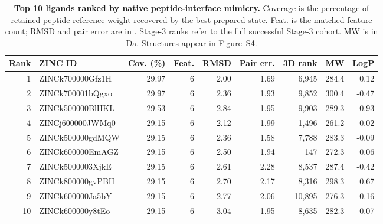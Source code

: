 \begin{table}[tbp]
\centering
\caption{\textbf{Top 10 ligands ranked by native peptide-interface mimicry.} Coverage is the percentage of retained peptide-reference weight recovered by the best prepared state. Feat. is the matched feature count; RMSD and pair error are in \angstrom. Stage-3 ranks refer to the full successful Stage-3 cohort. MW is in Da. Structures appear in Figure~S4.}
\label{tab:top10}
\footnotesize
\setlength{\tabcolsep}{4pt}
\begin{tabular}{@{}rlrrrrrrr@{}}
\toprule
Rank & ZINC ID & Cov. (\%) & Feat. & RMSD & Pair err. & 3D rank & MW & LogP \\
\midrule
1 & ZINCk700000Gfz1H & 29.97 & 6 & 2.00 & 1.69 & 6,945 & 284.4 & 0.12 \\
2 & ZINCk700001bQgxo & 29.97 & 6 & 2.36 & 1.93 & 9,852 & 300.4 & -0.47 \\
3 & ZINCk500000BlHKL & 29.53 & 6 & 2.84 & 1.95 & 9,903 & 289.3 & -0.93 \\
4 & ZINCj600000JWMq0 & 29.15 & 6 & 2.12 & 1.99 & 1,496 & 261.2 & 0.02 \\
5 & ZINCk500000gdMQW & 29.15 & 6 & 2.36 & 1.58 & 7,788 & 283.3 & -0.09 \\
6 & ZINCk600000EmAGZ & 29.15 & 6 & 2.50 & 1.94 & 147 & 272.3 & 0.06 \\
7 & ZINCk5000003XjkE & 29.15 & 6 & 2.61 & 2.28 & 8,537 & 287.4 & -0.42 \\
8 & ZINCk800000gvPBH & 29.15 & 6 & 2.70 & 2.17 & 8,316 & 298.3 & 0.67 \\
9 & ZINCk600000Ja5bY & 29.15 & 6 & 2.77 & 2.06 & 10,895 & 276.3 & -0.16 \\
10 & ZINCk600000y8tEo & 29.15 & 6 & 3.04 & 1.95 & 8,635 & 282.3 & 0.07 \\
\bottomrule
\end{tabular}
\end{table}
